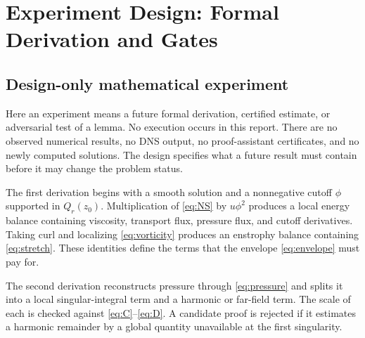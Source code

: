 \documentclass[conference]{../../../../Conference-LaTeX-template_10-17-19/IEEEtran}
\begin{document}
\section{Experiment Design: Formal Derivation and Gates}
\subsection{Design-only mathematical experiment}
Here an experiment means a future formal derivation, certified estimate, or adversarial test of a lemma. No execution occurs in this report. There are no observed numerical results, no DNS output, no proof-assistant certificates, and no newly computed solutions. The design specifies what a future result must contain before it may change the problem status.

The first derivation begins with a smooth solution and a nonnegative cutoff $\phi$ supported in $Q_r(z_0)$. Multiplication of \eqref{eq:NS} by $u\phi^2$ produces a local energy balance containing viscosity, transport flux, pressure flux, and cutoff derivatives. Taking curl and localizing \eqref{eq:vorticity} produces an enstrophy balance containing \eqref{eq:stretch}. These identities define the terms that the envelope \eqref{eq:envelope} must pay for.

The second derivation reconstructs pressure through \eqref{eq:pressure} and splits it into a local singular-integral term and a harmonic or far-field term. The scale of each is checked against \eqref{eq:C}--\eqref{eq:D}. A candidate proof is rejected if it estimates a harmonic remainder by a global quantity unavailable at the first singularity.
\end{document}
